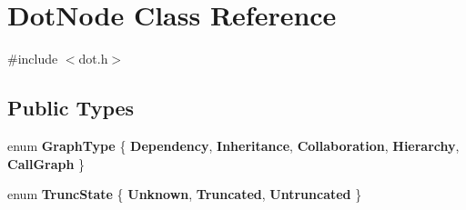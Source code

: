 \hypertarget{class_dot_node}{}\section{Dot\+Node Class Reference}
\label{class_dot_node}


{\ttfamily \#include $<$dot.\+h$>$}

\subsection*{Public Types}
\begin{DoxyCompactItemize}
\item 
\mbox{\label{class_dot_node_ac4e8b27d54919cd0afa73f4c8c7d569c}} 
enum {\bfseries Graph\+Type} \{ \newline
{\bfseries Dependency}, 
{\bfseries Inheritance}, 
{\bfseries Collaboration}, 
{\bfseries Hierarchy}, 
\newline
{\bfseries Call\+Graph}
 \}
\item 
\mbox{\label{class_dot_node_ac40de94762a7659599b2056942373102}} 
enum {\bfseries Trunc\+State} \{ {\bfseries Unknown}, 
{\bfseries Truncated}, 
{\bfseries Untruncated}
 \}
\end{DoxyCompactItemize}
